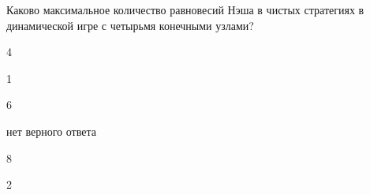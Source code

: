 
\begin{question}
Каково максимальное количество равновесий Нэша в чистых стратегиях в
динамической игре с четырьмя конечными узлами?
\begin{answerlist}
  \item 4
  \item 1
  \item 6
  \item нет верного ответа
  \item 8
  \item 2
\end{answerlist}
\end{question}


